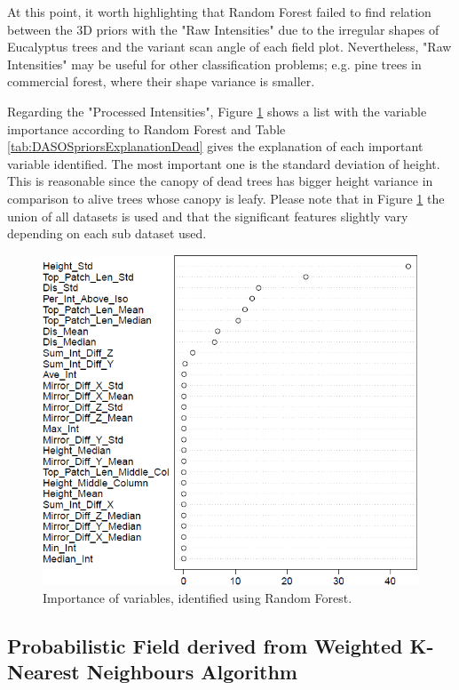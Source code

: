 \documentclass{subfiles}
\begin{document}
	
	\par At this point, it worth highlighting that Random Forest failed to find relation between the 3D priors with the "Raw Intensities" due to the irregular shapes of Eucalyptus trees and the variant scan angle of each field plot. Nevertheless, "Raw Intensities" may be useful for other classification problems; e.g. pine trees in commercial forest, where their shape variance is smaller.
	
	\par Regarding the "Processed Intensities", Figure \ref{fig:c0_RandomForest} shows a list with the variable importance according to Random Forest and Table \ref{tab:DASOSpriorsExplanationDead} gives the explanation of each important variable identified. The most important one is the standard deviation of height. This is reasonable since the canopy of dead trees has bigger height variance in comparison to alive trees whose canopy is leafy. Please note that in Figure \ref{fig:c0_RandomForest} the union of all datasets is used and that the significant features slightly vary depending on each sub dataset used.  
	
		\begin{figure} [h!]			
				\centering
				\includegraphics[width=.67\textwidth]{img/dead/c0_random_forest}
				\caption{Importance of variables, identified using Random Forest.}
				\label{fig:c0_RandomForest}
		\end{figure}
		

	
	
	
\subsection{Probabilistic Field derived from Weighted K-Nearest Neighbours Algorithm }
\end{document}
